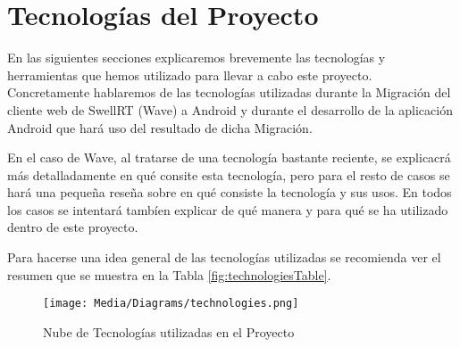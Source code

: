 \newpage
\thispagestyle{sectioned}
\chapter{Tecnologías del Proyecto}

En las siguientes secciones explicaremos brevemente las tecnologías y herramientas que hemos utilizado para llevar a cabo este proyecto. Concretamente hablaremos de las tecnologías utilizadas durante la Migración del cliente web de SwellRT (Wave) a Android y durante el desarrollo de la aplicación Android que hará uso del resultado de dicha Migración. 

En el caso de Wave, al tratarse de una tecnología bastante reciente, se explicacrá más detalladamente en qué consite esta tecnología, pero para el resto de casos se hará una pequeña reseña sobre en qué consiste la tecnología y sus usos. En todos los casos se intentará tambíen explicar de qué manera y para qué se ha utilizado dentro de este proyecto.

Para hacerse una idea general de las tecnologías utilizadas se recomienda ver el resumen que se muestra en la Tabla \ref{fig:technologiesTable}. 

	\begin{figure}[H]
	  \centering
	    \texttt{[image: Media/Diagrams/technologies.png]}
	  \caption{Nube de Tecnologías utilizadas en el Proyecto}
	  \label{fig:technologies}
	\end{figure}	
 
